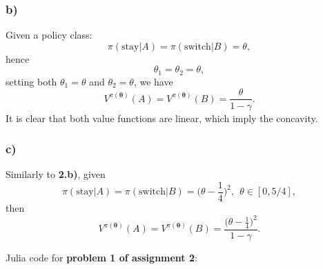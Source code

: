 \documentclass[12pt]{article}
\begin{document}
\subsubsection*{b)}
Given a policy class:
\begin{equation}
    \pi(\text{stay}|A) = \pi(\text{switch}|B) = \theta,
\end{equation}
hence
\begin{equation*}
    \theta_1 = \theta_2 = \theta,
\end{equation*}
setting both $\theta_1 = \theta$ and $\theta_2 = \theta$, we have
\begin{equation*}
    V^{\pi(\boldsymbol\theta)}(A) = V^{\pi(\boldsymbol\theta)}(B) = \frac{\theta}{1-\gamma}.
\end{equation*}
It is clear that both value functions are linear, which imply the concavity.
\subsubsection*{c)}
Similarly to \textbf{2.b)}, given
\begin{equation*}
    \pi(\text{stay}|A) = \pi(\text{switch}|B) = \Big(\theta - \frac{1}{4}\Big)^2, ~~ \theta \in [0, 5/4],
\end{equation*}
then
\begin{equation*}
    V^{\pi(\boldsymbol\theta)}(A) = V^{\pi(\boldsymbol\theta)}(B) = \frac{\Big(\theta - \frac{1}{4}\Big)^2}{1-\gamma}.
\end{equation*}

\newpage
\begin{appendices}
    Julia code for \textbf{problem 1 of assignment 2}:
\end{appendices}
\end{document}
